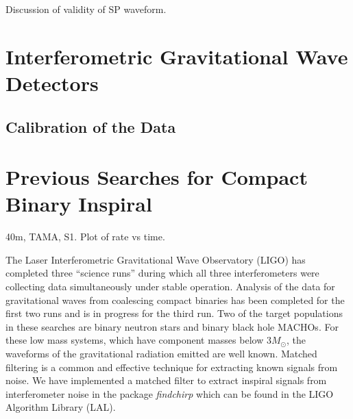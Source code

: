 Discussion of validity of SP waveform.


\section{Interferometric Gravitational Wave Detectors}
\label{s:ifo}

\subsection{Calibration of the Data}
\label{ss:calibration}

\section{Previous Searches for Compact Binary Inspiral}

40m, TAMA, S1. Plot of rate vs time.


The Laser Interferometric Gravitational Wave Observatory (LIGO)\cite{barish}
has completed three ``science runs'' during which all three interferometers
were collecting data simultaneously under stable operation. Analysis of the
data for gravitational waves from coalescing compact binaries has been
completed for the first two runs\cite{bns1,bns2,macho} and is in progress for
the third run. Two of the target populations in these searches are binary
neutron stars\cite{300yrs} and binary black hole
MACHOs\cite{sammacho,nakamura}. For these low mass systems, which have
component masses below $3 M_\odot$, the waveforms of the gravitational
radiation emitted are well known\cite{bdiww,biww}.  Matched filtering is a
common and effective technique for extracting known signals from
noise\cite{wz}. We have implemented a matched filter to extract inspiral
signals from interferometer noise in the package \emph{findchirp} which can be
found in the LIGO Algorithm Library (LAL)\cite{lal}.

